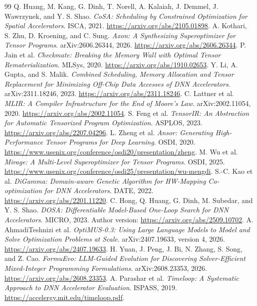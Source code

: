 \begin{thebibliography}{99}
 Q. Huang, M. Kang, G. Dinh, T. Norell, A. Kalaiah, J. Demmel, J. Wawrzynek, and Y. S. Shao. \emph{CoSA: Scheduling by Constrained Optimization for Spatial Accelerators}. ISCA, 2021. \url{https://arxiv.org/abs/2105.01898}.
 A. Kothari, S. Zhu, D. Kroening, and C. Sung. \emph{Axon: A Synthesizing Superoptimizer for Tensor Programs}. arXiv:2606.26344, 2026. \url{https://arxiv.org/abs/2606.26344}.
 P. Jain et al. \emph{Checkmate: Breaking the Memory Wall with Optimal Tensor Rematerialization}. MLSys, 2020. \url{https://arxiv.org/abs/1910.02653}.
 Y. Li, A. Gupta, and S. Malik. \emph{Combined Scheduling, Memory Allocation and Tensor Replacement for Minimizing Off-Chip Data Accesses of DNN Accelerators}. arXiv:2311.18246, 2023. \url{https://arxiv.org/abs/2311.18246}.
 C. Lattner et al. \emph{MLIR: A Compiler Infrastructure for the End of Moore's Law}. arXiv:2002.11054, 2020. \url{https://arxiv.org/abs/2002.11054}.
 S. Feng et al. \emph{TensorIR: An Abstraction for Automatic Tensorized Program Optimization}. ASPLOS, 2023. \url{https://arxiv.org/abs/2207.04296}.
 L. Zheng et al. \emph{Ansor: Generating High-Performance Tensor Programs for Deep Learning}. OSDI, 2020. \url{https://www.usenix.org/conference/osdi20/presentation/zheng}.
 M. Wu et al. \emph{Mirage: A Multi-Level Superoptimizer for Tensor Programs}. OSDI, 2025. \url{https://www.usenix.org/conference/osdi25/presentation/wu-mengdi}.
 S.-C. Kao et al. \emph{DiGamma: Domain-aware Genetic Algorithm for HW-Mapping Co-optimization for DNN Accelerators}. DATE, 2022. \url{https://arxiv.org/abs/2201.11220}.
 C. Hong, Q. Huang, G. Dinh, M. Subedar, and Y. S. Shao. \emph{DOSA: Differentiable Model-Based One-Loop Search for DNN Accelerators}. MICRO, 2023. Author version: \url{https://arxiv.org/abs/2509.10702}.
 A. AhmadiTeshnizi et al. \emph{OptiMUS-0.3: Using Large Language Models to Model and Solve Optimization Problems at Scale}. arXiv:2407.19633, version 4, 2026. \url{https://arxiv.org/abs/2407.19633}.
 H. Yuan, J. Peng, J. Bi, N. Zhang, S. Song, and Z. Cao. \emph{FormuEvo: LLM-Guided Evolution for Discovering Solver-Efficient Mixed-Integer Programming Formulations}. arXiv:2608.23353, 2026. \url{https://arxiv.org/abs/2608.23353}.
 A. Parashar et al. \emph{Timeloop: A Systematic Approach to DNN Accelerator Evaluation}. ISPASS, 2019. \url{https://accelergy.mit.edu/timeloop.pdf}.

\end{thebibliography}
